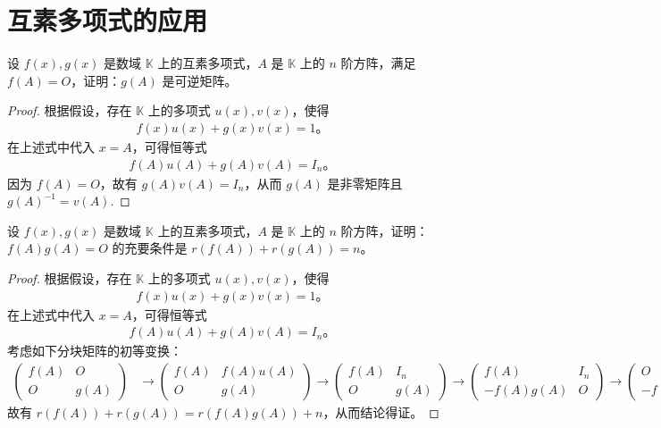 \documentclass[../../main.tex]{subfiles}
\begin{document}
\section{互素多项式的应用}

\begin{proposition}
设 $f(x), g(x)$ 是数域 $\mathbb{K}$ 上的互素多项式，$A$ 是 $\mathbb{K}$ 上的 $n$ 阶方阵，满足 $f(A) = O$，证明：$g(A)$ 是可逆矩阵。
\end{proposition}
\begin{proof}
根据假设，存在 $\mathbb{K}$ 上的多项式 $u(x), v(x)$，使得
\begin{align*}
f(x)u(x) + g(x)v(x) = 1。
\end{align*}
在上述式中代入 $x = A$，可得恒等式
\begin{align*}
f(A)u(A) + g(A)v(A) = I_n。
\end{align*}
因为 $f(A) = O$，故有 $g(A)v(A) = I_n$，从而 $g(A)$ 是非零矩阵且 $g(A)^{-1} = v(A)$.
\end{proof}

\begin{proposition}
设 $f(x), g(x)$ 是数域 $\mathbb{K}$ 上的互素多项式，$A$ 是 $\mathbb{K}$ 上的 $n$ 阶方阵，证明：$f(A)g(A) = O$ 的充要条件是 $r(f(A)) + r(g(A)) = n$。
\end{proposition}
\begin{proof}
根据假设，存在 $\mathbb{K}$ 上的多项式 $u(x), v(x)$，使得
\begin{align*}
f(x)u(x) + g(x)v(x) = 1。
\end{align*}
在上述式中代入 $x = A$，可得恒等式
\begin{align*}
f(A)u(A) + g(A)v(A) = I_n。
\end{align*}
考虑如下分块矩阵的初等变换：
\begin{align*}
\begin{pmatrix}
f(A) & O \\
O & g(A)
\end{pmatrix}
&\to
\begin{pmatrix}
f(A) & f(A)u(A) \\
O & g(A)
\end{pmatrix}
\to
\begin{pmatrix}
f(A) & I_n \\
O & g(A)
\end{pmatrix}
\to
\begin{pmatrix}
f(A) & I_n \\
-f(A)g(A) & O
\end{pmatrix}
\to
\begin{pmatrix}
O & I_n \\
-f(A)g(A) & O
\end{pmatrix},
\end{align*}
故有 $r(f(A)) + r(g(A)) = r(f(A)g(A)) + n$，从而结论得证。
\end{proof}
\end{document}
